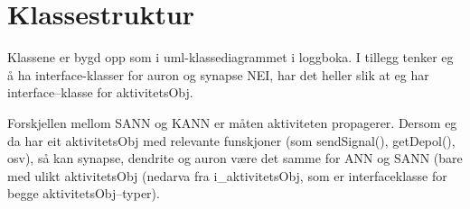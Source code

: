 
\section{Klassestruktur}
Klassene er bygd opp som i uml-klassediagrammet i loggboka. I tillegg tenker eg å ha interface-klasser for auron og synapse
NEI, har det heller slik at eg har interface--klasse for aktivitetsObj.

Forskjellen mellom SANN og KANN er måten aktiviteten propagerer. Dersom eg da har eit aktivitetsObj med relevante funskjoner (som sendSignal(), getDepol(), osv), så kan synapse, dendrite og auron være det samme for ANN og SANN (bare med ulikt aktivitetsObj (nedarva fra i\_aktivitetsObj, som er interfaceklasse for begge aktivitetsObj--typer).

